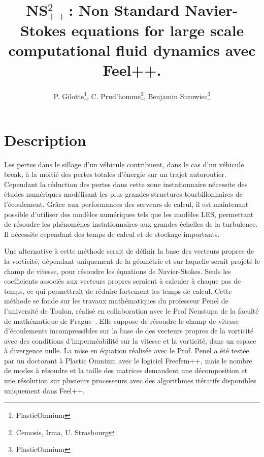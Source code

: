 \documentclass[12pt]{article}
\title{NS$^2_{++}$: Non Standard Navier-Stokes equations for large scale computational
fluid dynamics avec Feel++.}
\author{P. Gilotte\thanks{PlasticOmnium}, C. Prud'homme\thanks{Cemosis,
Irma, U. Strasbourg}, Benjamin Surowiec\thanks{PlasticOmnium}}
\begin{document}
\maketitle


\section{Description}
\label{sec:description}

Les pertes dans le sillage d’un véhicule contribuent, dans le cas d’un véhicule
break, à la moitié des pertes totales d’énergie sur un trajet
autoroutier. Cependant la réduction des pertes dans cette zone instationnaire
nécessite des études numériques modélisant les plus grandes structures
tourbillonnaires de l’écoulement. Grâce aux performances des serveurs de calcul,
il est maintenant possible d’utiliser des modèles numériques tels que les
modèles LES, permettant de résoudre les phénomènes instationnaires aux grandes
échelles de la turbulence. Il nécessite cependant des temps de calcul et de
stockage importants.

Une alternative à cette méthode serait de définir la base des vecteurs propres
de la vorticité, dépendant uniquement de la géométrie et sur laquelle serait
projeté le champ de vitesse, pour résoudre les équations de Navier-Stokes. Seuls
les coefficients associés aux vecteurs propres seraient à calculer à chaque pas
de temps, ce qui permettrait de réduire fortement les temps de calcul. Cette
méthode se fonde sur les travaux mathématiques du professeur Penel de
l’université de Toulon, réalisé en collaboration avec le Prof Neustupa de la
faculté de mathématique de Prague~\cite{Penel2004}. Elle suppose de résoudre le
champ de vitesse d’écoulements incompressibles sur la base de des vecteurs
propres de la vorticité avec des conditions d’imperméabilité sur la vitesse et
la vorticité, dans un espace à divergence nulle. La mise en équation réalisée
avec le Prof. Penel a été testée par un doctorant à Plastic Omnium avec le
logiciel Freefem++, mais le nombre de modes à résoudre et la taille des matrices
demandent une décomposition et une résolution sur plusieurs processeurs avec des
algorithmes itératifs disponibles uniquement dans Feel++.
\end{document}
